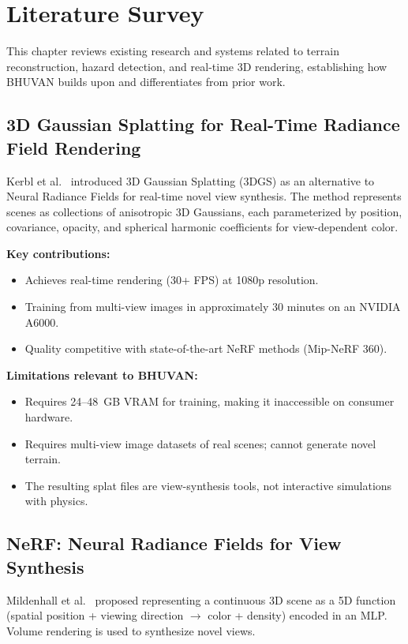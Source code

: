 \chapter{Literature Survey}

This chapter reviews existing research and systems related to terrain reconstruction, hazard detection, and real-time 3D rendering, establishing how BHUVAN builds upon and differentiates from prior work.

\section{3D Gaussian Splatting for Real-Time Radiance Field Rendering}
Kerbl et al.\ \cite{kerbl2023gaussian} introduced 3D Gaussian Splatting (3DGS) as an alternative to Neural Radiance Fields for real-time novel view synthesis. The method represents scenes as collections of anisotropic 3D Gaussians, each parameterized by position, covariance, opacity, and spherical harmonic coefficients for view-dependent color.

\textbf{Key contributions:}
\begin{itemize}
    \item Achieves real-time rendering (30+ FPS) at 1080p resolution.
    \item Training from multi-view images in approximately 30 minutes on an NVIDIA A6000.
    \item Quality competitive with state-of-the-art NeRF methods (Mip-NeRF 360).
\end{itemize}

\textbf{Limitations relevant to BHUVAN:}
\begin{itemize}
    \item Requires 24--48~GB VRAM for training, making it inaccessible on consumer hardware.
    \item Requires multi-view image datasets of real scenes; cannot generate novel terrain.
    \item The resulting splat files are view-synthesis tools, not interactive simulations with physics.
\end{itemize}

\section{NeRF: Neural Radiance Fields for View Synthesis}
Mildenhall et al.\ \cite{mildenhall2020nerf} proposed representing a continuous 3D scene as a 5D function (spatial position + viewing direction $\rightarrow$ color + density) encoded in an MLP. Volume rendering is used to synthesize novel views.

